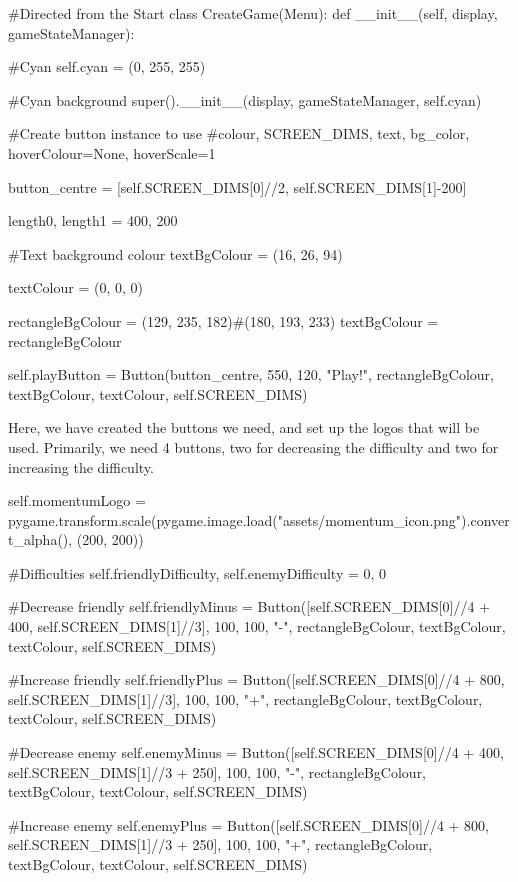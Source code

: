 \begin{mpy}
#Directed from the Start
class CreateGame(Menu):
    def __init__(self, display, gameStateManager):

        #Cyan
        self.cyan = (0, 255, 255)

        #Cyan background
        super().__init__(display, gameStateManager, self.cyan)

        #Create button instance to use
        #colour, SCREEN_DIMS, text, bg_color, hoverColour=None, hoverScale=1

        button_centre = [self.SCREEN_DIMS[0]//2, self.SCREEN_DIMS[1]-200]

        length0, length1 = 400, 200

        #Text background colour
        textBgColour = (16, 26, 94)

        textColour = (0, 0, 0)

        rectangleBgColour = (129, 235, 182)#(180, 193, 233)
        textBgColour = rectangleBgColour

        self.playButton = Button(button_centre, 550, 120, "Play!", rectangleBgColour, textBgColour, textColour, self.SCREEN_DIMS)
\end{mpy}

Here, we have created the buttons we need, and set up the logos that will be used. Primarily, we need 4 buttons, two for decreasing the difficulty and two for increasing the difficulty.

\begin{mpy}
        self.momentumLogo = pygame.transform.scale(pygame.image.load("assets/momentum_icon.png").convert_alpha(), (200, 200))

        #Difficulties
        self.friendlyDifficulty, self.enemyDifficulty = 0, 0

        #Decrease friendly
        self.friendlyMinus = Button([self.SCREEN_DIMS[0]//4 + 400, self.SCREEN_DIMS[1]//3], 100, 100, "-", rectangleBgColour, textBgColour, textColour, self.SCREEN_DIMS)

        #Increase friendly
        self.friendlyPlus = Button([self.SCREEN_DIMS[0]//4 + 800, self.SCREEN_DIMS[1]//3], 100, 100, "+", rectangleBgColour, textBgColour, textColour, self.SCREEN_DIMS)

        #Decrease enemy
        self.enemyMinus = Button([self.SCREEN_DIMS[0]//4 + 400, self.SCREEN_DIMS[1]//3 + 250], 100, 100, "-", rectangleBgColour, textBgColour, textColour, self.SCREEN_DIMS)

        #Increase enemy
        self.enemyPlus = Button([self.SCREEN_DIMS[0]//4 + 800, self.SCREEN_DIMS[1]//3 + 250], 100, 100, "+", rectangleBgColour, textBgColour, textColour, self.SCREEN_DIMS)
\end{mpy}


